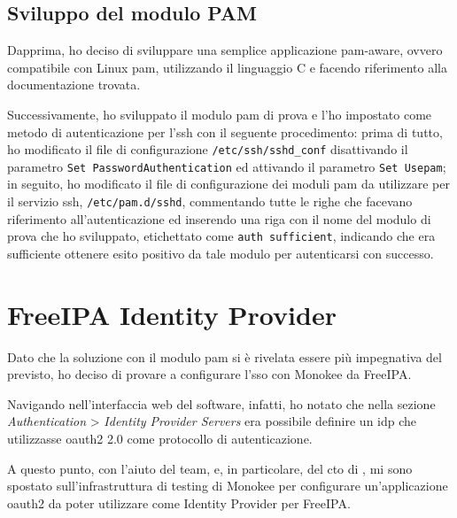 \subsection{Sviluppo del modulo PAM}
Dapprima, ho deciso di sviluppare una semplice applicazione \acrshort{pam}-aware\cite{site:pam-app}, ovvero compatibile con Linux \acrshort{pam}, utilizzando il linguaggio C e facendo riferimento alla documentazione trovata\cite{site:writing-pam-application}\cite{site:understanding-pam}\cite{site:pam-configuration}\cite{site:linux-man-online}.  

Successivamente, ho sviluppato il modulo \acrshort{pam} di prova\cite{site:pam-module}\cite{site:pam-module-oidc} e l'ho impostato come metodo di autenticazione per l'\acrshort{ssh} con il seguente procedimento\cite{site:writing-pam-module}: prima di tutto, ho modificato il file di configurazione \texttt{/etc/ssh/sshd\_conf} disattivando il parametro \texttt{Set PasswordAuthentication} ed attivando il parametro \texttt{Set Use\acrshort{pam}}; in seguito, ho modificato il file di configurazione dei moduli \acrshort{pam} da utilizzare per il servizio \acrshort{ssh}, \texttt{/etc/pam.d/sshd}, commentando tutte le righe che facevano riferimento all'autenticazione ed inserendo una riga con il nome del modulo di prova che ho sviluppato, etichettato come \texttt{auth  sufficient}, indicando che era sufficiente ottenere esito positivo da tale modulo per autenticarsi con successo. 

\section{FreeIPA Identity Provider}

Dato che la soluzione con il modulo \acrshort{pam} si è rivelata essere più impegnativa del previsto, ho deciso di provare a configurare l'\acrshort{sso} con Monokee da FreeIPA. 

Navigando nell'interfaccia web del software, infatti, ho notato che nella sezione \textit{Authentication} > \textit{Identity Provider Servers} era possibile definire un \acrshort{idp} che utilizzasse \acrshort{oauth2} 2.0 come protocollo di autenticazione\cite{site:freeipa-docs}.

A questo punto, con l'aiuto del team, e, in particolare, del \acrfull{cto} di \myAzienda, mi sono spostato sull'infrastruttura di testing di Monokee per configurare un'applicazione \acrshort{oauth2} da poter utilizzare come Identity Provider per FreeIPA.


